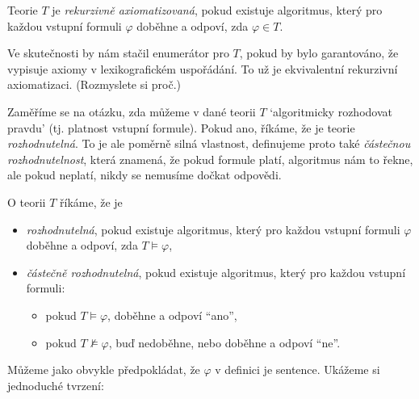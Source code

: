 \begin{definition}
    Teorie $T$ je \emph{rekurzivně axiomatizovaná}, pokud existuje algoritmus, který pro každou vstupní formuli $\varphi$ doběhne a odpoví, zda $\varphi\in T$.
\end{definition}

\begin{remark}
    Ve skutečnosti by nám stačil enumerátor pro $T$, pokud by bylo garantováno, že vypisuje axiomy v lexikografickém uspořádání. To už je ekvivalentní rekurzivní axiomatizaci. (Rozmyslete si proč.)
\end{remark}

Zaměříme se na otázku, zda můžeme v dané teorii $T$ `algoritmicky rozhodovat pravdu' (tj. platnost vstupní formule). Pokud ano, říkáme, že je teorie \emph{rozhodnutelná}. To je ale poměrně silná vlastnost, definujeme proto také \emph{částečnou rozhodnutelnost}, která znamená, že pokud formule platí, algoritmus nám to řekne, ale pokud neplatí, nikdy se nemusíme dočkat odpovědi.

\begin{definition}[Rozhodnutelnost]
O teorii $T$ říkáme, že je
\begin{itemize}
    \item \emph{rozhodnutelná}, pokud existuje algoritmus, který pro každou vstupní formuli $\varphi$ doběhne a odpoví, zda $T\models\varphi$,
    \item \emph{částečně rozhodnutelná}, pokud existuje algoritmus, který pro každou vstupní formuli:
    \begin{itemize}
        \item pokud $T\models\varphi$, doběhne a odpoví ``ano'',
        \item pokud $T\not\models\varphi$, buď nedoběhne, nebo doběhne a odpoví ``ne''.
    \end{itemize}
\end{itemize}
\end{definition}
Můžeme jako obvykle předpokládat, že $\varphi$ v definici je sentence. Ukážeme si jednoduché tvrzení:

